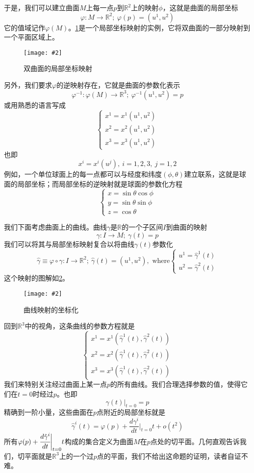 \documentclass[a4paper,11pt]{ctexart}
\newcommand{\beq}{\begin{equation}}
\newcommand{\eeq}{\end{equation}}
\newcommand{\reals}{\mathbb{R}}
\newcommand{\cpic}[2]{
\begin{center}
\texttt{[image: \#2]}
\end{center}
}
\newcommand{\cpicn}[3]
{
\begin{figure}[h!]
\cpic{#1}{#2}
\caption{#3\label{#2}}
\end{figure}
}
\begin{document}
\par
于是，我们可以建立曲面$M$上每一点$p$到$\reals^2$上的映射$\phi$，这就是曲面的局部坐标
\beq
\varphi : M \rightarrow \reals^2 ;\  \varphi(p) = (u^1,u^2)
\eeq
它的值域记作$\varphi(M)$。\cref{localcoor}是一个局部坐标映射的实例，它将双曲面的一部分映射到一个平面区域上。
\cpicn{0.3}{localcoor}{双曲面的局部坐标映射}
另外，我们要求$\varphi$的逆映射存在，它就是曲面的参数化表示
\beq
\varphi^{-1}: \varphi(M) \rightarrow \reals^3;\ \varphi^{-1}(u^1,u^2) = p
\eeq
或用熟悉的语言写成
\beq
\begin{cases}
x^1 = x^1(u^1,u^2) \\
x^2 = x^2(u^1,u^2) \\
x^3 = x^3(u^1,u^2)
\end{cases}
\eeq
也即
\beq
x^i = x^i(u^j),\ i = 1,2,3, \ j = 1,2
\eeq
例如，一个单位球面上的每一点都可以与经度和纬度$(\phi,\theta)$建立联系，这就是球面的局部坐标；而局部坐标的逆映射就是球面的参数化方程
\beq
\begin{cases}
x = \sin \theta \cos \phi \\
y = \sin \theta \sin \phi \\
z = \cos \theta
\end{cases}
\eeq
\par
我们下面考虑曲面上的曲线。曲线$\gamma$是$\reals$的一个子区间$I$到曲面的映射
\beq
\gamma: I \to M; \ \gamma(t) = p
\eeq
我们可以将其与局部坐标映射复合以将曲线$\gamma (t)$参数化
\beq
\hat{\gamma} \equiv \varphi \circ \gamma: I \to \reals^2;\ \hat{\gamma}(t) = (u^1,u^2),\text{ where}
\begin{cases}
u^1 = \hat{\gamma}^1(t) \\
u^2 = \hat{\gamma}^2(t)
\end{cases}
\eeq
这个映射的图解如\cref{curve}。
\cpicn{0.18}{curve}{曲线映射的坐标化}
\par
回到$\reals^3$中的视角，这条曲线的参数方程就是
\beq
\begin{cases}
x^1 = x^1(\hat{\gamma}^1(t),\hat{\gamma}^2(t)) \\
x^2 = x^2(\hat{\gamma}^1(t),\hat{\gamma}^2(t)) \\
x^3 = x^3(\hat{\gamma}^1(t),\hat{\gamma}^2(t))
\end{cases}
\eeq
我们来特别关注经过曲面上某一点$p$的所有曲线。我们合理选择参数的值，使得它们在$t = 0$时经过$p$。也即
\beq
\gamma(t)\bigg|_{t=0} = p
\eeq
精确到一阶小量，这些曲面在$p$点附近的局部坐标就是
\beq
\hat{\gamma}^i(t) = \varphi(p) + \frac{d\gamma^i}{dt}\bigg|_{t=0} t + o(t^2)
\eeq
所有$\varphi(p) + \cfrac{d\hat{\gamma}^i}{dt}\bigg|_{t=0} t$构成的集合定义为曲面$M$在$p$点处的切平面。几何直观告诉我们，切平面就是$\reals^3$上的一个过$p$点的平面，我们不给出这命题的证明，读者自证不难。
\end{document}
